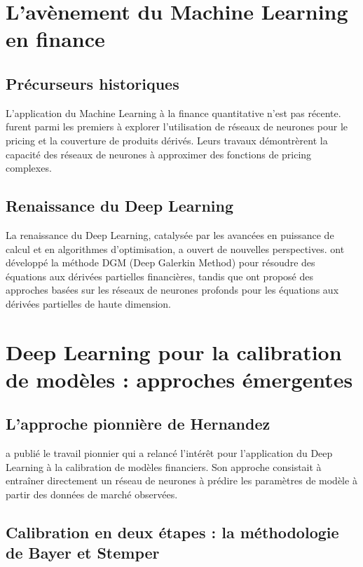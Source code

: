 \section{L'avènement du Machine Learning en finance}

\subsection{Précurseurs historiques}

L'application du Machine Learning à la finance quantitative n'est pas récente. \citet{hutchinson1994nonparametric} furent parmi les premiers à explorer l'utilisation de réseaux de neurones pour le pricing et la couverture de produits dérivés. Leurs travaux démontrèrent la capacité des réseaux de neurones à approximer des fonctions de pricing complexes.

\subsection{Renaissance du Deep Learning}

La renaissance du Deep Learning, catalysée par les avancées en puissance de calcul et en algorithmes d'optimisation, a ouvert de nouvelles perspectives. \citet{sirignano2018dgm} ont développé la méthode DGM (Deep Galerkin Method) pour résoudre des équations aux dérivées partielles financières, tandis que \citet{beck2017deep} ont proposé des approches basées sur les réseaux de neurones profonds pour les équations aux dérivées partielles de haute dimension.

\section{Deep Learning pour la calibration de modèles : approches émergentes}

\subsection{L'approche pionnière de Hernandez}

\citet{hernandez2017model} a publié le travail pionnier qui a relancé l'intérêt pour l'application du Deep Learning à la calibration de modèles financiers. Son approche consistait à entraîner directement un réseau de neurones à prédire les paramètres de modèle à partir des données de marché observées.

\subsection{Calibration en deux étapes : la méthodologie de Bayer et Stemper}


